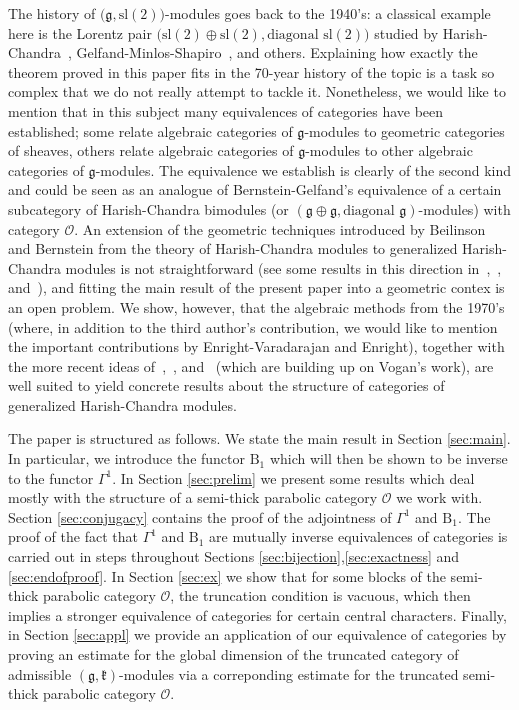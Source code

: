 \documentclass{tglat2e}
\theoremstyle{definition}
\theoremstyle{remark}
\newcommand{\kk}{\mathfrak{k}}
\renewcommand{\gg}{\mathfrak{g}}
\begin{document}
The history of $\big(\mathfrak{g},\mathrm{sl}(2)\big)$-modules goes back to the 1940's: a classical example here is the Lorentz pair $\big(\mathrm{sl}(2)\oplus\mathrm{sl}(2), \text{diagonal } \mathrm{sl}(2)\big)$ studied by Harish-Chandra~\cite{HC}, Gelfand-Minlos-Shapiro~\cite{GMS}, and others.  Explaining how exactly the theorem proved in this paper fits in the 70-year history of the topic is a task so complex that we do not really attempt to tackle it.  Nonetheless, we would like to mention that in this subject many equivalences of categories have been established; some relate algebraic categories of $\mathfrak{g}$-modules to geometric categories of sheaves, others relate algebraic categories of $\mathfrak{g}$-modules to other algebraic categories of $\mathfrak{g}$-modules.  The equivalence we establish is clearly of the second kind and could be seen as an analogue of Bernstein-Gelfand's equivalence of a certain subcategory of Harish-Chandra bimodules (or $(\mathfrak{g}\oplus\mathfrak{g},\text{diagonal }\mathfrak{g})$-modules) with category $\mathcal{O}$.  An extension of the geometric techniques introduced by Beilinson and Bernstein from the theory of Harish-Chandra modules to generalized Harish-Chandra modules is not straightforward (see some results in this direction in~\cite{PSZ},~\cite{PS1}, and~\cite{Pe}), and fitting the main result of the present paper into a geometric contex is an open problem.  We show, however, that the algebraic methods from the 1970's (where, in addition to the third author's contribution, we would like to mention the important contributions by Enright-Varadarajan and Enright), together with the more recent ideas of~\cite{PZ1},~\cite{PZ5}, and~\cite{PZ6} (which are building up on Vogan's work), are well suited to yield concrete results about the structure of categories of generalized Harish-Chandra modules.

The paper is structured as follows. We state the main result in Section \ref{sec:main}. In particular, we introduce the functor $\mathrm{B}_1$ which will then be 
shown to be inverse to the functor $\Gamma^1$. In Section \ref{sec:prelim} we present some results which deal  mostly with the 
structure of a semi-thick parabolic category $\mathcal O$ we work with. Section \ref{sec:conjugacy} contains the proof of the adjointness of $\Gamma^1$ and
$\mathrm{B}_1$. The proof of the fact that $\Gamma^1$ and $\mathrm{B}_1$ are mutually inverse equivalences of categories is carried out in steps throughout Sections
\ref{sec:bijection},\ref{sec:exactness} and \ref {sec:endofproof}. In Section \ref{sec:ex} we show that for some blocks of the semi-thick parabolic category $\mathcal O$, the truncation condition
is vacuous, which then implies a stronger equivalence of categories for certain central characters. Finally, in Section \ref{sec:appl} we provide an 
application of our equivalence of categories by proving an estimate for the global dimension of the truncated category of admissible $(\gg,\kk)$-modules via a correponding estimate for the truncated semi-thick parabolic category $\mathcal O$.
\end{document}
